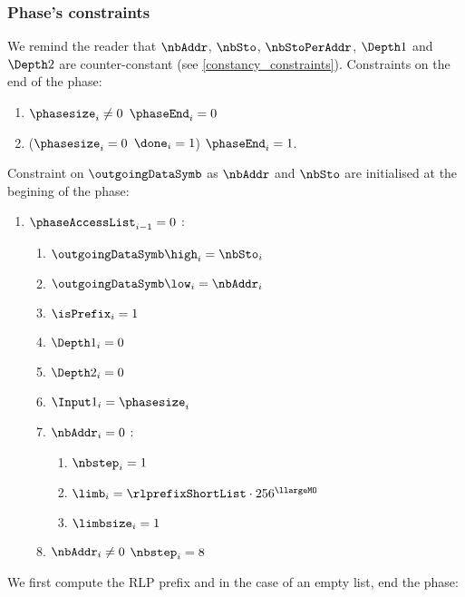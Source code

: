 \subsubsection{Phase's constraints}
We remind the reader that $\nbAddr$, $\nbSto$, $\nbStoPerAddr$, $\Depth1$ and $\Depth2$ are counter-constant (see \ref{constancy_constraints}).
\newline
Constraints on the end of the phase:
\begin{enumerate}
	\item \If $\phasesize_{i} \neq 0$ \Then $\phaseEnd_{i}=0$
	\item\label{constraint: end of access set phase} \If ($\phasesize_{i}=0$ \et $\done_{i}=1$) \Then $\phaseEnd_{i}=1$.
\end{enumerate}
Constraint on $\outgoingDataSymb$ as $\nbAddr$ and $\nbSto$ are initialised at the begining of the phase:
\begin{enumerate}[resume]
    \item \If $\phaseAccessList_{i-1}=0$ \Then:
    \begin{enumerate}
        \item $\outgoingDataSymb\high_{i}=\nbSto_{i}$
        \item $\outgoingDataSymb\low_{i}=\nbAddr_{i}$
		\item $\isPrefix_{i}=1$
		\item $\Depth1_{i} = 0$
		\item $\Depth2_{i} = 0$
		\item $\Input1_{i} = \phasesize_{i}$
		\item \If $\nbAddr_{i}=0$ \Then: 
		\begin{enumerate}
			\item $\nbstep_{i}=1$
			\item $\limb_{i}=\rlprefixShortList \cdot 256 ^{\llargeMO}$
			\item $\limbsize_{i}=1$
		\end{enumerate}
		\item \If $\nbAddr_{i} \neq 0$ \Then $\nbstep_{i}=8$
    \end{enumerate} 
\end{enumerate}
We first compute the RLP prefix and in the case of an empty list, end the phase:
